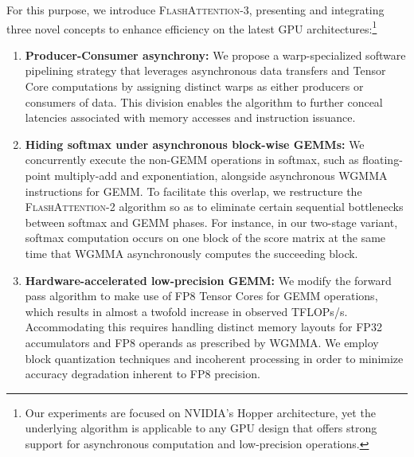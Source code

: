 For this purpose, we introduce \textsc{FlashAttention-3}, presenting and integrating three novel concepts to enhance efficiency on the latest GPU architectures:\footnote{Our experiments are focused on NVIDIA's Hopper architecture, yet the underlying algorithm is applicable to any GPU design that offers strong support for asynchronous computation and low-precision operations.}

\begin{enumerate}

\item \textbf{Producer-Consumer asynchrony:} We propose a warp-specialized software pipelining strategy that leverages asynchronous data transfers and Tensor Core computations by assigning distinct warps as either producers or consumers of data. This division enables the algorithm to further conceal latencies associated with memory accesses and instruction issuance.

\item \textbf{Hiding softmax under asynchronous block-wise GEMMs:} We concurrently execute the non-GEMM operations in softmax, such as floating-point multiply-add and exponentiation, alongside asynchronous WGMMA instructions for GEMM. To facilitate this overlap, we restructure the \textsc{FlashAttention-2} algorithm so as to eliminate certain sequential bottlenecks between softmax and GEMM phases. For instance, in our two-stage variant, softmax computation occurs on one block of the score matrix at the same time that WGMMA asynchronously computes the succeeding block.

\item \textbf{Hardware-accelerated low-precision GEMM:} We modify the forward pass algorithm to make use of FP8 Tensor Cores for GEMM operations, which results in almost a twofold increase in observed TFLOPs/s. Accommodating this requires handling distinct memory layouts for FP32 accumulators and FP8 operands as prescribed by WGMMA. We employ block quantization techniques and incoherent processing in order to minimize accuracy degradation inherent to FP8 precision.
\end{enumerate}

